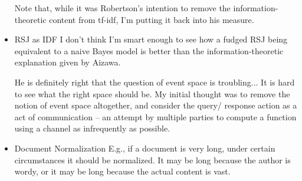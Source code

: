 \documentclass{article}
\begin{document}
\begin{itemize}
    Note that, while it was Robertson's intention to remove the information-theoretic content from tf-idf, I'm putting it back into his measure.

\item RSJ as IDF
    I don't think I'm smart enough to see how a fudged RSJ being equivalent to a naive Bayes model is better than the information-theoretic explanation given by Aizawa.

    He is definitely right that the question of event space is troubling...  It is hard to see what the right space should be.  My initial thought was to remove the notion of event space altogether, and consider the query/ response action as a act of communication -- an attempt by multiple parties to compute a function using a channel as infrequently as possible.

\item Document Normalization
    E.g., if a document is very long, under certain circumstances it should be normalized.  It may be long because the author is wordy, or it may be long because the actual content is vast.

\end{itemize}

\end{document}

